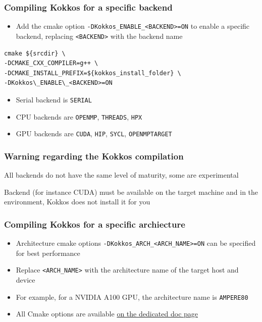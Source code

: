 \documentclass[aspectratio=169]{beamer}
\begin{document}
\begin{frame}[fragile]
    \frametitle{Compiling Kokkos for a specific backend} 

\begin{itemize}
    \item Add the cmake option \texttt{-DKokkos\_ENABLE\_<BACKEND>=ON} to enable a specific backend, replacing \texttt{<BACKEND>} with the backend name
\end{itemize}
\small
\begin{verbatim}
cmake ${srcdir} \
-DCMAKE_CXX_COMPILER=g++ \ 
-DCMAKE_INSTALL_PREFIX=${kokkos_install_folder} \
-DKokkos\_ENABLE\_<BACKEND>=ON
\end{verbatim}
\normalsize
\begin{itemize}
    \item Serial backend is \texttt{SERIAL}
    \item CPU backends are \texttt{OPENMP}, \texttt{THREADS}, \texttt{HPX}
    \item GPU backends are \texttt{CUDA}, \texttt{HIP}, \texttt{SYCL}, \texttt{OPENMPTARGET}
\end{itemize}   

\end{frame}


\begin{frame}[fragile]
    \frametitle{Warning regarding the Kokkos compilation}

    \begin{alertblock}{}
        All backends do not have the same level of maturity, some are experimental
    \end{alertblock}

    \begin{alertblock}{}
        Backend (for instance CUDA) must be available on the target machine and in the environment, Kokkos does not install it for you
    \end{alertblock}

\end{frame}


\begin{frame}[fragile]
    \frametitle{Compiling Kokkos for a specific archiecture}

\begin{itemize}
    \item Architecture cmake options \texttt{-DKokkos\_ARCH\_<ARCH\_NAME>=ON} can be specified for best performance
    \item Replace \texttt{<ARCH\_NAME>} with the architecture name of the target host and device
    \item For example, for a NVIDIA A100 GPU, the architecture name is \texttt{AMPERE80}
    \item All Cmake options are available \href{https://kokkos.org/kokkos-core-wiki/keywords.html#}{on the dedicated doc page}
\end{itemize}

\end{frame}
\end{document}
